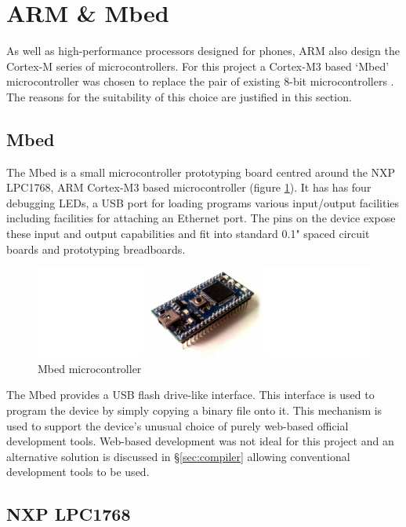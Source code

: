 	\section{ARM \& Mbed}
		
		As well as high-performance processors designed for phones, ARM also design
		the Cortex-M series of microcontrollers. For this project a Cortex-M3 based
		`Mbed' microcontroller was chosen to replace the pair of existing 8-bit
		microcontrollers \cite{mbed}. The reasons for the suitability of this choice
		are justified in this section.
		
		\subsection{Mbed}
			
			The Mbed is a small microcontroller prototyping board centred around the
			NXP LPC1768, ARM Cortex-M3 based microcontroller (figure \ref{fig:mbed}).
			It has has four debugging LEDs, a USB port for loading programs various
			input/output facilities including facilities for attaching an Ethernet
			port. The pins on the device expose these input and output capabilities
			and fit into standard 0.1" spaced circuit boards and prototyping
			breadboards.
			
			\begin{figure}
				\includegraphics[width=1\textwidth]{diagrams/mbed.pdf}
				\caption{Mbed microcontroller}
				\label{fig:mbed}
			\end{figure}
			
			The Mbed provides a USB flash drive-like interface. This interface is used
			to program the device by simply copying a binary file onto it. This
			mechanism is used to support the device's unusual choice of purely
			web-based official development tools. Web-based development was not ideal
			for this project and an alternative solution is discussed in
			\S\ref{sec:compiler} allowing conventional development tools to be used.
		
		\subsection{NXP LPC1768}
			
